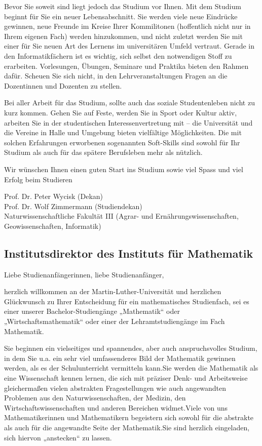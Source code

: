 Bevor Sie soweit sind liegt jedoch das Studium vor Ihnen.
Mit dem Studium beginnt für Sie ein neuer Lebensabschnitt.
Sie werden viele neue Eindrücke gewinnen, neue Freunde im Kreise Ihrer Kommilitonen (hoffentlich nicht nur in Ihrem eigenen Fach) werden hinzukommen, und nicht zuletzt werden Sie mit einer für Sie neuen Art des Lernens im universitären Umfeld vertraut.
Gerade in den Informatikfächern ist es wichtig, sich selbst den notwendigen Stoff zu erarbeiten.
Vorlesungen, Übungen, Seminare und Praktika bieten den Rahmen dafür.
Scheuen Sie sich nicht, in den Lehrveranstaltungen Fragen an die Dozentinnen und Dozenten zu stellen.

Bei aller Arbeit für das Studium, sollte auch das soziale Studentenleben nicht zu kurz kommen.
Gehen Sie auf Feste, werden Sie in Sport oder Kultur aktiv, arbeiten Sie in der studentischen Interessenvertretung mit -- die Universität und die Vereine in Halle und Umgebung bieten vielfältige Möglichkeiten.
Die mit solchen Erfahrungen erworbenen sogenannten Soft-Skills sind sowohl für Ihr Studium als auch für das spätere Berufsleben mehr als nützlich.

Wir wünschen Ihnen einen guten Start ins Studium sowie viel Spass und viel Erfolg beim Studieren

Prof. Dr. Peter Wycisk (Dekan)\\
Prof. Dr. Wolf Zimmermann (Studiendekan)\\
Naturwissenschaftliche Fakultät III (Agrar- und Ernährungswissenschaften, \newline Geowissenschaften, Informatik)


\subsection{Institutsdirektor des Instituts für Mathematik}

Liebe Studienanfängerinnen, liebe Studienanfänger,

herzlich willkommen an der Martin-Luther-Universität und herzlichen Glückwunsch zu Ihrer Entscheidung für ein mathematisches Studienfach, sei es einer unserer Bachelor-Studiengänge „Mathematik“ oder „Wirtschaftsmathematik“ oder einer der Lehramtstudiengänge im Fach Mathematik.

Sie beginnen ein vielseitiges und spannendes, aber auch anspruchsvolles Studium, in dem Sie u.a. ein sehr viel umfassenderes Bild der Mathematik gewinnen werden, als es der Schulunterricht vermitteln kann.Sie werden die Mathematik als eine Wissenschaft kennen lernen, die sich mit präziser Denk- und Arbeitsweise gleichermaßen vielen abstrakten Fragestellungen wie auch angewandten Problemen aus den Naturwissenschaften, der Medizin, den Wirtschaftswissenschaften und anderen Bereichen widmet.Viele von uns Mathematikerinnen und Mathematikern begeistern sich sowohl für die abstrakte als auch für die angewandte Seite der Mathematik.Sie sind herzlich eingeladen, sich hiervon „anstecken“ zu lassen.

